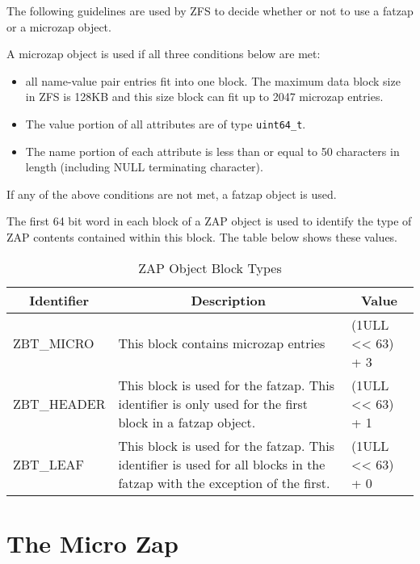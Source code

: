 The following guidelines are used by ZFS to decide
whether or not to use a fatzap or a microzap object.
\begin{center}
\begin{minipage}[c]{.8\textwidth}
  A microzap object is used if all three conditions below are met:
  \begin{itemize}
  \item all name-value pair entries fit into one block.
    The maximum data block size in ZFS is 128KB and
    this size block can fit up to 2047 microzap entries.
  \item The value portion of all attributes are of type \lstinline{uint64_t}.
  \item The name portion of each attribute is less than or equal to 50 characters in length
    (including NULL terminating character).
  \end{itemize}
  If any of the above conditions are not met, a fatzap object is used.
\end{minipage}
\end{center}

The first 64 bit word in each block of a ZAP object
is used to identify the type of ZAP contents contained within this block.
The table below shows these values.

\begin{table}[ht]
  \centering
  \caption{ZAP Object Block Types}\label{tbl:zap_obj_block_types}
  \begin{tabular}{lp{5cm}l}
    \toprule
    \multicolumn{1}{c}{\textbf{Identifier}} &
    \multicolumn{1}{c}{\textbf{Description}} &
    \multicolumn{1}{c}{\textbf{Value}}\\
    \midrule
    ZBT\_MICRO & This block contains microzap entries &(1ULL << 63) + 3\\
    ZBT\_HEADER & This block is used for the fatzap.
    This identifier is only used for the first block in a fatzap object.
    & (1ULL << 63) + 1\\
    ZBT\_LEAF & This block is used for the fatzap.
    This identifier is used for all blocks in the fatzap with the exception of the first.
    & (1ULL << 63) + 0\\
    \bottomrule
  \end{tabular}
\end{table}

\section{The Micro Zap}


